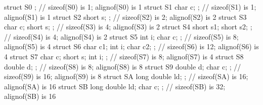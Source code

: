 \begin{emcppslisting}[emcppsbatch=e1]
struct S0 { };                           // sizeof(S0) is  1; alignof(S0) is  1   
struct S1 { char c; };                   // sizeof(S1) is  1; alignof(S1) is  1   
struct S2 { short s; };                  // sizeof(S2) is  2; alignof(S2) is  2   
struct S3 { char c; short s; };          // sizeof(S3) is  4; alignof(S3) is  2   
struct S4 { short s1; short s2; };       // sizeof(S4) is  4; alignof(S4) is  2   
struct S5 { int i; char c; };            // sizeof(S5) is  8; alignof(S5) is  4   
struct S6 { char c1; int i; char c2; };  // sizeof(S6) is 12; alignof(S6) is  4   
struct S7 { char c; short s; int i; };   // sizeof(S7) is  8; alignof(S7) is  4   
struct S8 { double d; };                 // sizeof(S8) is  8; alignof(S8) is  8   
struct S9 { double d; char c; };         // sizeof(S9) is 16; alignof(S9) is  8   
struct SA { long double ld; };           // sizeof(SA) is 16; alignof(SA) is 16   
struct SB { long double ld; char c; };   // sizeof(SB) is 32; alignof(SB) is 16
\end{emcppslisting}

